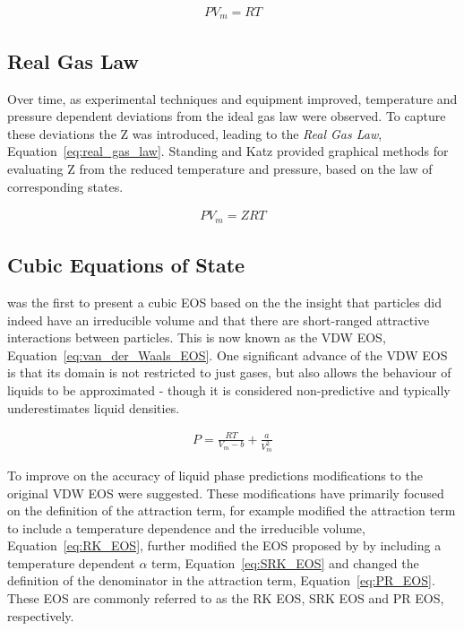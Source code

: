         \begin{align}
            P V_m = R T  \label{eq:ideal_gas_law}
        \end{align}

    \subsection{Real Gas Law}
        Over time, as experimental techniques and equipment improved, temperature and pressure dependent deviations from the ideal gas law were observed. To capture these deviations the \ac{Z} was introduced, leading to the \emph{Real Gas Law}, Equation~\ref{eq:real_gas_law}. Standing and Katz provided graphical methods for evaluating \ac{Z} from the reduced temperature and pressure, based on the law of corresponding states.
    
        \begin{align}
            P V_m = Z R T  \label{eq:real_gas_law}
        \end{align}

    \subsection{Cubic Equations of State}
        \citeauthor{Waals1873} was the first to present a cubic \ac{EOS} based on the the insight that particles did indeed have an irreducible volume and that there are short-ranged attractive interactions between particles. This is now known as the \ac{VDW} \ac{EOS}, Equation~\ref{eq:van_der_Waals_EOS}. One significant advance of the \ac{VDW} \ac{EOS} is that its domain is not restricted to just gases, but also allows the behaviour of liquids to be approximated - though it is considered non-predictive and typically underestimates liquid densities.
    
        \begin{align}
            P = \frac{R T}{V_m - b} + \frac{a}{V_m^2}  \label{eq:van_der_Waals_EOS}
        \end{align}

        To improve on the accuracy of liquid phase predictions modifications to the original \ac{VDW} \ac{EOS} were suggested. These modifications have primarily focused on the definition of the attraction term, for example \citeauthor{Redlich1949} modified the attraction term to include a temperature dependence and the irreducible volume, Equation~\ref{eq:RK_EOS}, \citeauthor{Soave1972} further modified the \ac{EOS} proposed by \citeauthor{Redlich1949} by including a temperature dependent \(\alpha\) term, Equation~\ref{eq:SRK_EOS} and \citeauthor{Peng1976} changed the definition of the denominator in the attraction term, Equation~\ref{eq:PR_EOS}. These \ac{EOS} are commonly referred to as the \ac{RK} \ac{EOS}, \ac{SRK} \ac{EOS} and \ac{PR} \ac{EOS}, respectively.
    
